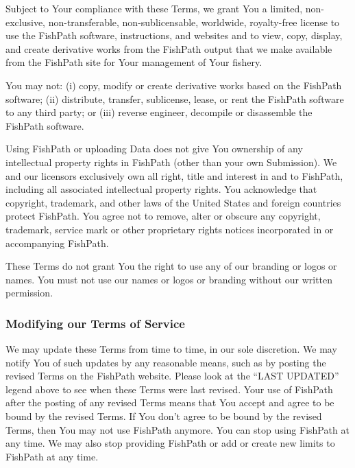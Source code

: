 \documentclass[
  11pt,
]{book}
\begin{document}
Subject to Your compliance with these Terms, we grant You a limited, non-exclusive, non-transferable, non-sublicensable, worldwide, royalty-free license to use the FishPath software, instructions, and websites and to view, copy, display, and create derivative works from the FishPath output that we make available from the FishPath site for Your management of Your fishery.

You may not: (i) copy, modify or create derivative works based on the FishPath software; (ii) distribute, transfer, sublicense, lease, or rent the FishPath software to any third party; or (iii) reverse engineer, decompile or disassemble the FishPath software.

Using FishPath or uploading Data does not give You ownership of any intellectual property rights in FishPath (other than your own Submission). We and our licensors exclusively own all right, title and interest in and to FishPath, including all associated intellectual property rights. You acknowledge that copyright, trademark, and other laws of the United States and foreign countries protect FishPath. You agree not to remove, alter or obscure any copyright, trademark, service mark or other proprietary rights notices incorporated in or accompanying FishPath.

These Terms do not grant You the right to use any of our branding or logos or names. You must not use our names or logos or branding without our written permission.

\hypertarget{modifying-our-terms-of-service}{%
\subsubsection*{Modifying our Terms of Service}\label{modifying-our-terms-of-service}}

We may update these Terms from time to time, in our sole discretion. We may notify You of such updates by any reasonable means, such as by posting the revised Terms on the FishPath website. Please look at the ``LAST UPDATED'' legend above to see when these Terms were last revised. Your use of FishPath after the posting of any revised Terms means that You accept and agree to be bound by the revised Terms. If You don't agree to be bound by the revised Terms, then You may not use FishPath anymore. You can stop using FishPath at any time. We may also stop providing FishPath or add or create new limits to FishPath at any time.
\end{document}
